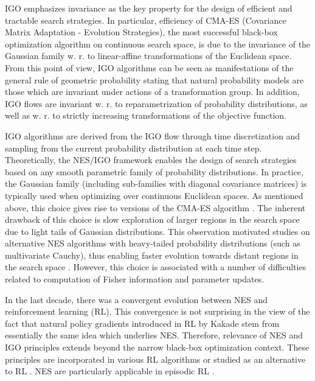 \documentclass{article}
\theoremstyle{plain}%
\theoremstyle{definition}
\theoremstyle{remark}
\theoremstyle{prop}
\begin{document}
IGO emphasizes invariance as the key property for the design of efficient and tractable search strategies. In particular, efficiency of CMA-ES (Covariance Matrix Adaptation - Evolution Strategies), the most successful black-box optimization algorithm on continuous search space, is due to the invariance of the Gaussian family w. r. to linear-affine transformations of the Euclidean space. From this point of view, IGO algorithms can be seen as manifestations of the general rule of geometric probability \cite{Santalo} stating that natural probability models are those which are invariant under actions of a transformation group. In addition, IGO flows are invariant w. r. to reparametrization of probability distributions, as well as w. r. to strictly increasing transformations of the objective function. 

IGO algorithms are derived from the IGO flow through time discretization and sampling from the current probability distribution at each time step.
Theoretically, the NES/IGO framework enables the design of search strategies based on any smooth parametric family of probability distributions. In practice, the Gaussian family (including sub-families with diagonal covariance matrices) is typically used when optimizing over continuous Euclidean spaces. As mentioned above, this choice gives rise to versions of the CMA-ES algorithm \cite{HO,HA,ANOK}. The inherent drawback of this choice is slow exploration of larger regions in the search space due to light tails of Gaussian distributions. This observation motivated studies on alternative NES algorithms with heavy-tailed probability distributions (such as multivariate Cauchy), thus enabling faster evolution towards distant regions in the search space \cite{SGS}. However, this choice is associated with a number of difficulties related to computation of Fisher information and parameter updates. 

In the last decade, there was a convergent evolution between NES and reinforcement learning (RL). This convergence is not surprising in the view of the fact that natural policy gradients introduced in RL by Kakade \cite{Kakade} stem from essentially the same idea which underlies NES. Therefore, relevance of NES and IGO principles extends beyond the narrow black-box optimization context. These principles are incorporated in various RL algorithms or studied as an alternative to RL \cite{SHCSS,KO}. NES are particularly applicable in episodic RL \cite{HN}. 

\end{document}
